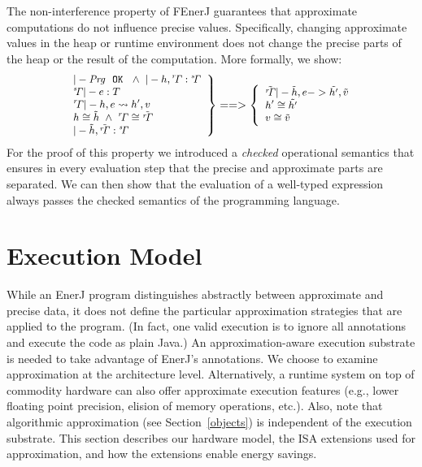 The non-interference property of FEnerJ guarantees that
approximate computations do not influence precise values. Specifically,
changing approximate values in the heap or runtime environment
does not change the precise parts of the heap or the result of the
computation.
More formally, we show:
\[
\small
\left.
\begin{array}{l}
|- \mathit{Prg}\ \ \mathtt{OK} \ \ \wedge\  |- h, \rG : \sG\\
\sG |- e : T\\
\rG |- h, e \leadsto h', v\\
h \cong \tilde{h}  \ \wedge\  \rG \cong \tilde{\rG}\\
|- \tilde{h}, \tilde{\rG} : \sG\\
\end{array}
\right\}
==>
\left\{
\begin{array}{l}
\tilde{\rG} |- \tilde{h}, e -> \tilde{h'}, \tilde{v}\\
h' \cong \tilde{h'}\\
v \cong \tilde{v}
\end{array}
\right.
\]
For the proof of this property we introduced a \emph{checked}
operational semantics that ensures in every evaluation step that the
precise and approximate parts are separated.
We can then show that the evaluation of a well-typed
expression always passes the checked semantics of the programming
language.




\section{Execution Model}
\label{sec:execution}

While an EnerJ program distinguishes abstractly between approximate and
precise data, it does not define the particular approximation strategies
that are applied to the program. (In fact, one valid execution is to ignore all
annotations and execute the code as plain Java.) An approximation-aware
execution substrate is needed to take advantage of EnerJ's annotations.
We choose to examine approximation at the architecture level.
Alternatively, a runtime system on top of commodity hardware can also
offer approximate execution features (e.g., lower floating point
precision, elision of memory operations, etc.).
Also, note that algorithmic approximation
(see Section~\ref{objects}) is independent of the
execution substrate.
This section describes our hardware model, the ISA extensions
used for approximation, and how the extensions enable energy savings.

